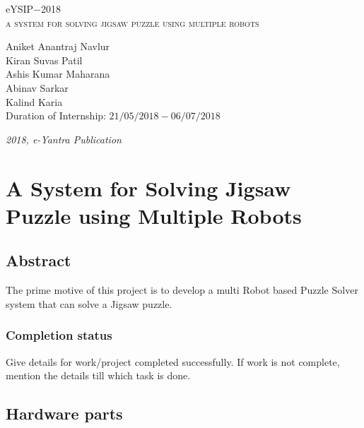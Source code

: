 \documentclass[a4paper,12pt,oneside]{book}
\begin{document}
\begin{titlepage}
\raggedright
{\Large eYSIP$-$2018\\[1 cm]}
{\Huge\scshape a system for solving jigsaw puzzle using multiple robots\\[.1 in]}
\vfill
\begin{flushright}
{\large Aniket Anantraj Navlur \\}
{\large Kiran Suvas Patil\\}
{\large Ashis Kumar Maharana\\}
{\large Abinav Sarkar\\}
{\large Kalind Karia\\}
{\large Duration of Internship: $ 21/05/2018-06/07/2018 $ \\}
\end{flushright}

{\itshape 2018, e-Yantra Publication}
\end{titlepage}

\chapter[Project Tag]{A System for Solving Jigsaw Puzzle using Multiple Robots}
\section*{Abstract}

The prime motive of this project is to develop a multi Robot based Puzzle Solver system that can solve a Jigsaw puzzle.


\subsection*{Completion status}
Give details for work/project completed successfully. If work is not
complete, mention the details till which task is done.

\section{Hardware parts}
\end{document}
